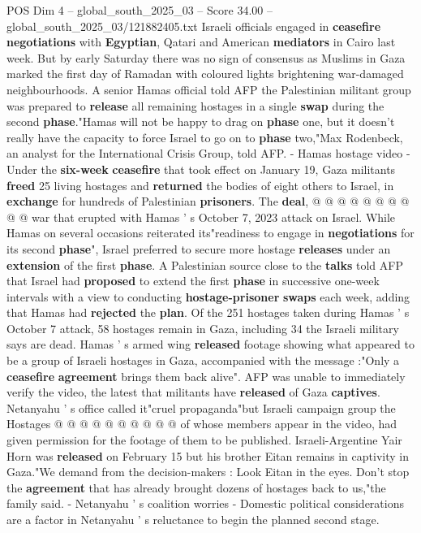 \begin{textsample}{POS Dim 4 – global\_south\_2025\_03 – Score 34.00 – global\_south\_2025\_03/121882405.txt}
Israeli officials engaged in \textbf{ceasefire} \textbf{negotiations} with \textbf{Egyptian}, Qatari and American \textbf{mediators} in Cairo last week.
But by early Saturday there was no sign of consensus as Muslims in Gaza marked the first day of Ramadan with coloured lights brightening war-damaged neighbourhoods.
A senior Hamas official told AFP the Palestinian militant group was prepared to \textbf{release} all remaining hostages in a single \textbf{swap} during the second \textbf{phase}."Hamas will not be happy to drag on \textbf{phase} one, but it doesn't really have the capacity to force Israel to go on to \textbf{phase} two,"Max Rodenbeck, an analyst for the International Crisis Group, told AFP. - Hamas hostage video - Under the \textbf{six-week} \textbf{ceasefire} that took effect on January 19, Gaza militants \textbf{freed} 25 living hostages and \textbf{returned} the bodies of eight others to Israel, in \textbf{exchange} for hundreds of Palestinian \textbf{prisoners}.
The \textbf{deal}, @ @ @ @ @ @ @ @ @ @ war that erupted with Hamas ' s October 7, 2023 attack on Israel.
While Hamas on several occasions reiterated its"readiness to engage in \textbf{negotiations} for its second \textbf{phase}", Israel preferred to secure more hostage \textbf{releases} under an \textbf{extension} of the first \textbf{phase}.
A Palestinian source close to the \textbf{talks} told AFP that Israel had \textbf{proposed} to extend the first \textbf{phase} in successive one-week intervals with a view to conducting \textbf{hostage-prisoner} \textbf{swaps} each week, adding that Hamas had \textbf{rejected} the \textbf{plan}.
Of the 251 hostages taken during Hamas ' s October 7 attack, 58 hostages remain in Gaza, including 34 the Israeli military says are dead.
Hamas ' s armed wing \textbf{released} footage showing what appeared to be a group of Israeli hostages in Gaza, accompanied with the message :"Only a \textbf{ceasefire} \textbf{agreement} brings them back alive".
AFP was unable to immediately verify the video, the latest that militants have \textbf{released} of Gaza \textbf{captives}.
Netanyahu ' s office called it"cruel propaganda"but Israeli campaign group the Hostages @ @ @ @ @ @ @ @ @ @ of whose members appear in the video, had given permission for the footage of them to be published.
Israeli-Argentine Yair Horn was \textbf{released} on February 15 but his brother Eitan remains in captivity in Gaza."We demand from the decision-makers : Look Eitan in the eyes.
Don't stop the \textbf{agreement} that has already brought dozens of hostages back to us,"the family said. - Netanyahu ' s coalition worries - Domestic political considerations are a factor in Netanyahu ' s reluctance to begin the planned second stage.

\end{textsample}
